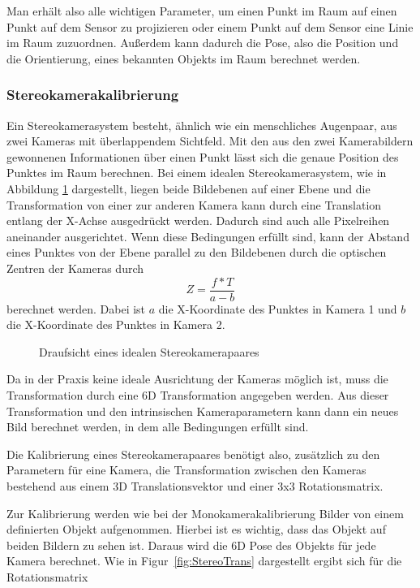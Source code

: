 Man erhält also alle wichtigen Parameter, um einen Punkt im Raum auf einen Punkt auf dem Sensor
zu projizieren oder einem Punkt auf dem Sensor eine Linie im Raum zuzuordnen.
Außerdem kann dadurch die Pose, also die Position und die Orientierung, eines bekannten Objekts im Raum berechnet
werden. 


\subsubsection{Stereokamerakalibrierung} %
\label{sssec:Stereokamerakalibrierung} Ein Stereokamerasystem besteht, ähnlich
wie ein menschliches Augenpaar, aus zwei Kameras mit überlappendem Sichtfeld.
Mit den aus den zwei Kamerabildern gewonnenen Informationen über einen Punkt
lässt sich die genaue Position des Punktes im Raum berechnen. Bei einem idealen
Stereokamerasystem, wie in Abbildung \ref{fig:DraufStereo} dargestellt, liegen beide
Bildebenen auf einer Ebene und die Transformation von einer zur anderen Kamera
kann durch eine Translation entlang der X-Achse ausgedrückt werden. Dadurch
sind auch alle Pixelreihen aneinander ausgerichtet.
Wenn diese Bedingungen erfüllt sind, kann der Abstand
eines Punktes von der Ebene parallel zu den Bildebenen durch die optischen
Zentren der Kameras durch \begin{equation} Z=\frac{f*T}{a-b} \end{equation}
berechnet werden. Dabei ist $a$ die X-Koordinate des Punktes in Kamera 1 und 
$b$ die X-Koordinate des Punktes in Kamera 2.


\begin{figure}[htpb] \centering \def\svgwidth{\textwidth}
   \caption{Draufsicht eines idealen
  Stereokamerapaares} \label{fig:DraufStereo} \end{figure}

Da in der Praxis keine ideale Ausrichtung der Kameras möglich ist, muss die
Transformation durch eine 6D Transformation angegeben werden. Aus dieser
Transformation und den intrinsischen Kameraparametern kann dann ein neues Bild
berechnet werden, in dem alle Bedingungen erfüllt sind.

Die Kalibrierung eines Stereokamerapaares benötigt also, zusätzlich zu den
Parametern für eine Kamera, die Transformation zwischen den Kameras bestehend
aus einem 3D Translationsvektor und einer 3x3 Rotationsmatrix.

Zur Kalibrierung werden wie bei der Monokamerakalibrierung Bilder von einem
definierten Objekt aufgenommen. Hierbei ist es wichtig, dass das Objekt auf
beiden Bildern zu sehen ist. Daraus wird die 6D Pose des Objekts für jede
Kamera berechnet. Wie in Figur~\ref{fig:StereoTrans} dargestellt ergibt sich
für die Rotationsmatrix

